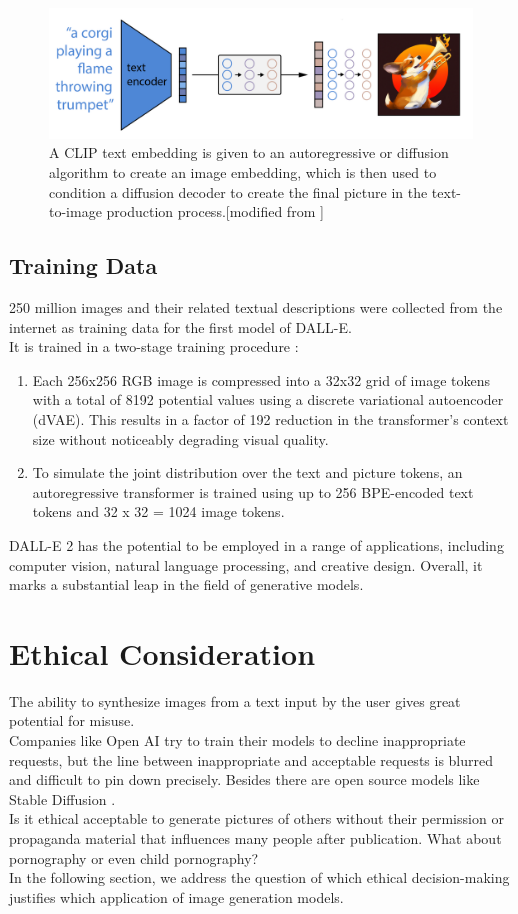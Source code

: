 \documentclass[9.5pt,twocolumn,twoside]{osajnl}
\begin{document}
\begin{figure} [h]
	\includegraphics[width = 1\linewidth]{images/highLevel.png}
	\caption{A CLIP text embedding is given to an autoregressive or diffusion algorithm to create an image embedding, which is then used to condition a diffusion decoder to create the final picture in the text-to-image production process.[modified from \cite{CLIP}]}
	\label{example}
\end{figure}

\subsection{Training Data}
250 million images and their related textual descriptions were collected from the internet as training data for the first model of DALL-E.\\
It is trained in a two-stage training procedure \cite{zeroShot}:
\begin{enumerate}
	\item Each 256x256 RGB image is compressed into a 32x32 grid of image tokens with a total of 8192 potential values using a discrete variational autoencoder (dVAE). This results in a factor of 192 reduction in the transformer's context size without noticeably degrading visual quality.
	\item To simulate the joint distribution over the text and picture tokens, an autoregressive transformer is trained using up to 256 BPE-encoded text tokens and 32 x 32 = 1024 image tokens.
\end{enumerate}
DALL-E 2 has the potential to be employed in a range of applications, including computer vision, natural language processing, and creative design. Overall, it marks a substantial leap in the field of generative models.


\section{Ethical Consideration}
The ability to synthesize images from a text input by the user gives great potential for misuse. \\
Companies like Open AI try to train their models to decline inappropriate requests, but the line between inappropriate and acceptable requests is blurred and difficult to pin down precisely. Besides there are open source models like Stable Diffusion \cite{StableDiffusion}.\\
Is it ethical acceptable to generate pictures of others without their permission or propaganda material that influences many people after publication. What about pornography or even child pornography?\\
In the following section, we address the question of which ethical decision-making justifies which application of image generation models.
\end{document}
